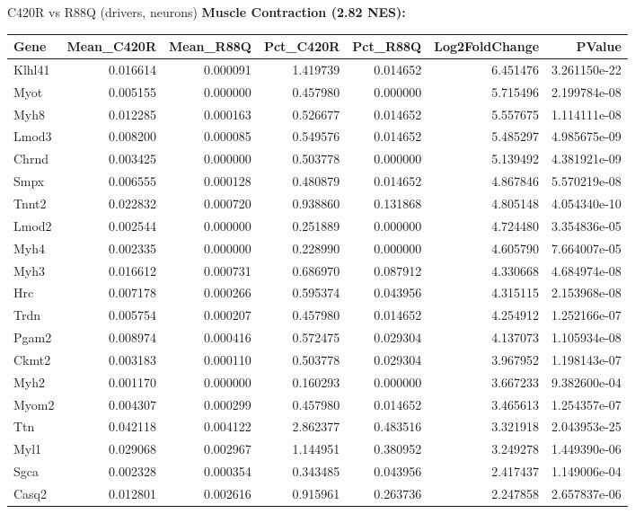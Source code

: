 \documentclass[10pt, aspectratio=169]{beamer}
\begin{document}
\begin{frame}{C420R vs R88Q (drivers, neurons)}
  \centering
  {\small \textbf{Muscle Contraction (2.82 NES):}}\par
  \vspace{0.15cm}
  \tiny
  \begin{tabular}{l r r r r r r}
    \toprule
    \textbf{Gene} & \textbf{Mean\_C420R} & \textbf{Mean\_R88Q} & \textbf{Pct\_C420R} & \textbf{Pct\_R88Q} & \textbf{Log2FoldChange} & \textbf{PValue} \\
    \midrule
    Klhl41 & 0.016614 & 0.000091 & 1.419739 & 0.014652 & 6.451476 & 3.261150e-22 \\
    Myot & 0.005155 & 0.000000 & 0.457980 & 0.000000 & 5.715496 & 2.199784e-08 \\
    Myh8 & 0.012285 & 0.000163 & 0.526677 & 0.014652 & 5.557675 & 1.114111e-08 \\
    Lmod3 & 0.008200 & 0.000085 & 0.549576 & 0.014652 & 5.485297 & 4.985675e-09 \\
    Chrnd & 0.003425 & 0.000000 & 0.503778 & 0.000000 & 5.139492 & 4.381921e-09 \\
    Smpx & 0.006555 & 0.000128 & 0.480879 & 0.014652 & 4.867846 & 5.570219e-08 \\
    Tnnt2 & 0.022832 & 0.000720 & 0.938860 & 0.131868 & 4.805148 & 4.054340e-10 \\
    Lmod2 & 0.002544 & 0.000000 & 0.251889 & 0.000000 & 4.724480 & 3.354836e-05 \\
    Myh4 & 0.002335 & 0.000000 & 0.228990 & 0.000000 & 4.605790 & 7.664007e-05 \\
    Myh3 & 0.016612 & 0.000731 & 0.686970 & 0.087912 & 4.330668 & 4.684974e-08 \\
    Hrc & 0.007178 & 0.000266 & 0.595374 & 0.043956 & 4.315115 & 2.153968e-08 \\
    Trdn & 0.005754 & 0.000207 & 0.457980 & 0.014652 & 4.254912 & 1.252166e-07 \\
    Pgam2 & 0.008974 & 0.000416 & 0.572475 & 0.029304 & 4.137073 & 1.105934e-08 \\
    Ckmt2 & 0.003183 & 0.000110 & 0.503778 & 0.029304 & 3.967952 & 1.198143e-07 \\
    Myh2 & 0.001170 & 0.000000 & 0.160293 & 0.000000 & 3.667233 & 9.382600e-04 \\
    Myom2 & 0.004307 & 0.000299 & 0.457980 & 0.014652 & 3.465613 & 1.254357e-07 \\
    Ttn & 0.042118 & 0.004122 & 2.862377 & 0.483516 & 3.321918 & 2.043953e-25 \\
    Myl1 & 0.029068 & 0.002967 & 1.144951 & 0.380952 & 3.249278 & 1.449390e-06 \\
    Sgca & 0.002328 & 0.000354 & 0.343485 & 0.043956 & 2.417437 & 1.149006e-04 \\
    Casq2 & 0.012801 & 0.002616 & 0.915961 & 0.263736 & 2.247858 & 2.657837e-06 \\
    \bottomrule
  \end{tabular}
\end{frame}
\end{document}

